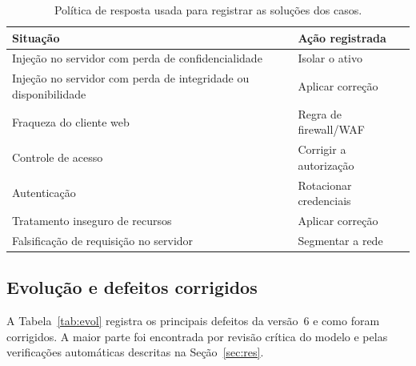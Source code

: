\documentclass[12pt]{article}
\begin{document}
\begin{table}[ht]
\centering\small
\caption{Política de resposta usada para registrar as soluções dos casos.}
\label{tab:politica}
\begin{tabular}{@{}ll@{}}
\toprule
Situação & Ação registrada\\
\midrule
Injeção no servidor com perda de confidencialidade & Isolar o ativo\\
Injeção no servidor com perda de integridade ou disponibilidade & Aplicar correção\\
Fraqueza do cliente web & Regra de firewall/WAF\\
Controle de acesso & Corrigir a autorização\\
Autenticação & Rotacionar credenciais\\
Tratamento inseguro de recursos & Aplicar correção\\
Falsificação de requisição no servidor & Segmentar a rede\\
\bottomrule
\end{tabular}
\end{table}

\subsection{Evolução e defeitos corrigidos}
\label{sec:evol}

A Tabela~\ref{tab:evol} registra os principais defeitos da versão~6 e como foram corrigidos. A maior parte foi encontrada por revisão crítica do modelo e pelas verificações automáticas descritas na Seção~\ref{sec:res}.
\end{document}

